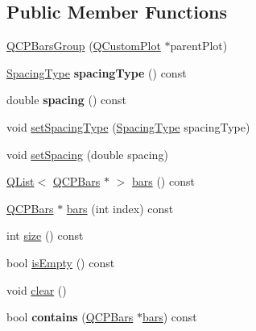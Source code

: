 \subsection*{Public Member Functions}
\begin{DoxyCompactItemize}
\item 
\hyperlink{class_q_c_p_bars_group_aa4e043b9a22c6c5ea0f93740aca063e1}{Q\+C\+P\+Bars\+Group} (\hyperlink{class_q_custom_plot}{Q\+Custom\+Plot} $\ast$parent\+Plot)
\item 
\mbox{\label{class_q_c_p_bars_group_a894a77c45325aad2e742d936bc1f8aea}} 
\hyperlink{class_q_c_p_bars_group_a4c0521120a97e60bbca37677a37075b6}{Spacing\+Type} {\bfseries spacing\+Type} () const
\item 
\mbox{\label{class_q_c_p_bars_group_a314d09aeb2ad209518b9183ca7ffe662}} 
double {\bfseries spacing} () const
\item 
void \hyperlink{class_q_c_p_bars_group_a2c7e2d61b10594a4555b615e1fcaf49e}{set\+Spacing\+Type} (\hyperlink{class_q_c_p_bars_group_a4c0521120a97e60bbca37677a37075b6}{Spacing\+Type} spacing\+Type)
\item 
void \hyperlink{class_q_c_p_bars_group_aa553d327479d72a0c3dafcc724a190e2}{set\+Spacing} (double spacing)
\item 
\hyperlink{class_q_list}{Q\+List}$<$ \hyperlink{class_q_c_p_bars}{Q\+C\+P\+Bars} $\ast$ $>$ \hyperlink{class_q_c_p_bars_group_a6e4f4e86abbec6a9342f204ef82abef8}{bars} () const
\item 
\hyperlink{class_q_c_p_bars}{Q\+C\+P\+Bars} $\ast$ \hyperlink{class_q_c_p_bars_group_a0754d659a020aa7fddfe81e657ce2d92}{bars} (int index) const
\item 
int \hyperlink{class_q_c_p_bars_group_a3780ec77919cb00840207ec7a0f00dd5}{size} () const
\item 
bool \hyperlink{class_q_c_p_bars_group_aac959e79e852e8ef9aea6e0449ad000a}{is\+Empty} () const
\item 
void \hyperlink{class_q_c_p_bars_group_a3ddf23928c6cd89530bd34ab7ba7b177}{clear} ()
\item 
\mbox{\label{class_q_c_p_bars_group_ae26da07a23553052a178fb3fae90d0dc}} 
bool {\bfseries contains} (\hyperlink{class_q_c_p_bars}{Q\+C\+P\+Bars} $\ast$\hyperlink{class_q_c_p_bars_group_a6e4f4e86abbec6a9342f204ef82abef8}{bars}) const
\item 

\end{DoxyCompactItemize}
